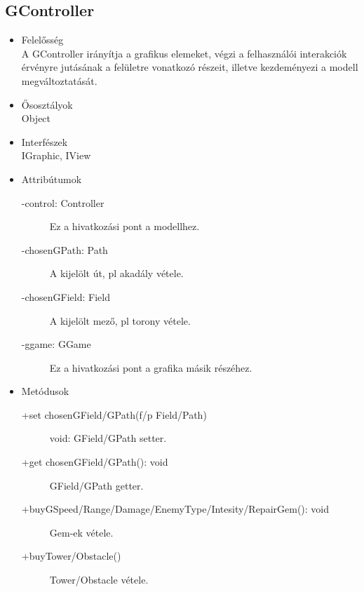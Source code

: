 \subsection{GController}
\begin{itemize}
\item Felelősség\\
A GController irányítja a grafikus elemeket, végzi a felhasználói interakciók érvényre jutásának a felületre vonatkozó részeit, illetve kezdeményezi a modell megváltoztatását.
\item Ősosztályok\\
Object
\item Interfészek\\
IGraphic, IView
\item Attribútumok\\
	\begin{description}
		\item[-control: Controller] Ez a hivatkozási pont a modellhez.
		\item[-chosenGPath: Path] A kijelölt út, pl akadály vétele.
		\item[-chosenGField: Field] A kijelölt mező, pl torony vétele.
		\item[-ggame: GGame] Ez a hivatkozási pont a grafika másik részéhez.
\end{description}
\item Metódusok\\
	\begin{description}
		\item[+set chosenGField/GPath(f/p Field/Path)] void: GField/GPath setter.
		\item[+get chosenGField/GPath(): void] GField/GPath getter.
		\item[+buyGSpeed/Range/Damage/EnemyType/Intesity/RepairGem(): void] Gem-ek vétele.
		\item[+buyTower/Obstacle()] Tower/Obstacle vétele.
	\end{description}
\end{itemize}

